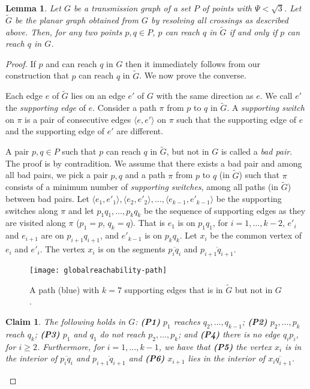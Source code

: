 \documentclass[11pt,a4paper]{paper}
\newtheorem{claim}[theorem]{Claim}
\newtheorem{lemma}[theorem]{Lemma}
\begin{document}
\begin{lemma}
\label{lem:globalreachability}
Let $G$ be a transmission graph of a set $P$ of points with $\Psi < \sqrt{3}$. Let $\widetilde{G}$
be the planar graph obtained from $G$ by resolving all crossings as described above. Then,
for any two points  $p, q \in P$, $p$ can reach $q$ in $\widetilde{G}$ if and only if $p$
can reach $q$ in $G$.
\end{lemma}

\begin{proof}
If $p$ and can reach $q$ in $G$ then it immediately follows from our construction that $p$ can reach
$q$ in $\widetilde{G}$. We now prove the converse.

Each edge $e$ of $\widetilde{G}$ lies on an edge $e'$ of $G$ with the
same direction as $e$. We call $e'$ the \emph{supporting edge} of $e$.
Consider a path $\pi$ from $p$ to $q$ in $\widetilde{G}$.
A \emph{supporting switch} on $\pi$ is a pair of consecutive edges 
$\langle e,e' \rangle$ on $\pi$
such that the supporting edge of $e$ and the supporting edge of $e'$ are different.

A pair $p, q \in P$ such that $p$ can reach
$q$ in $\widetilde{G}$, but not in $G$ is called a
\emph{bad pair}.
The proof is by contradition. We assume that there exists a bad pair and  among all bad pairs,
we pick a pair $p, q$
and a path $\pi$ from $p$ to $q$ (in $\widetilde{G}$) such that
$\pi$ consists of  a
minimum number of \emph{supporting switches}, among all paths (in $\widetilde{G}$) between bad pairs.
Let $\langle e_1,e'_1 \rangle, \langle e_2,e'_2 \rangle,\dots,
\langle e_{k-1},e'_{k-1} \rangle$ be the supporting switches 
along $\pi$ and let
 $p_1q_1,\dots, p_kq_k$ be the
sequence of supporting edges as they are visited along
$\pi$ ($p_1 = p$, $q_k = q$).
That is $e_1$ is on $p_1q_1$, for $i=1,\ldots,k-2$, $e'_i$ and $e_{i+1}$ are on $p_{i+1}q_{i+1}$, and
$e'_{k-1}$ is on $p_kq_k$.
Let $x_i$ be the common vertex of $e_i$ and $e'_{i}$. The vertex $x_i$ is on the segments $\overline{p_iq_i}$ and
$\overline{p_{i+1}q_{i+1}}$.

\begin{figure}[htb]
\centering
\texttt{[image: globalreachability-path]}
\caption{A path (blue) with $k=7$ supporting edges that is in
$\widetilde{G}$ but not in $G$.}
\label{fig:globalreachability-path}
\end{figure}

\begin{claim}
The following holds in $G$:
\textbf{(P1)} $p_1$ reaches $q_2,\dots,q_{k-1}$;
\textbf{(P2)} $p_2,\dots,p_k$ reach $q_k$;
\textbf{(P3)}  $p_1$ and $q_1$ do not reach $p_2,\dots,p_k$; and
\textbf{(P4)} there is no edge $q_ip_i$,
for $i \geq 2$.
Furthermore, for $i = 1,\dots,k-1$, we have that
\textbf{(P5)}
the vertex $x_i$ is in the interior of
$\overline{p_iq_i}$ and
$\overline{p_{i+1}q_{i+1}}$
and \textbf{(P6)} $x_{i+1}$ lies in the interior of
$\overline{x_iq_{i+1}}$.
\end{claim}


\end{proof}
\end{document}
